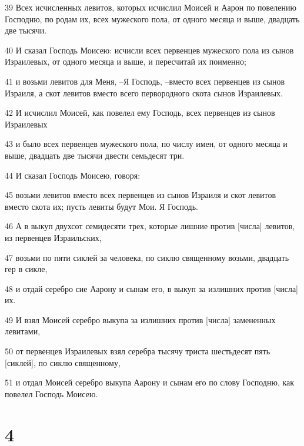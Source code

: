 \par 39 Всех исчисленных левитов, которых исчислил Моисей и Аарон по повелению Господню, по родам их, всех мужеского пола, от одного месяца и выше, двадцать две тысячи.
\par 40 И сказал Господь Моисею: исчисли всех первенцев мужеского пола из сынов Израилевых, от одного месяца и выше, и пересчитай их поименно;
\par 41 и возьми левитов для Меня, --Я Господь, --вместо всех первенцев из сынов Израиля, а скот левитов вместо всего первородного скота сынов Израилевых.
\par 42 И исчислил Моисей, как повелел ему Господь, всех первенцев из сынов Израилевых
\par 43 и было всех первенцев мужеского пола, по числу имен, от одного месяца и выше, двадцать две тысячи двести семьдесят три.
\par 44 И сказал Господь Моисею, говоря:
\par 45 возьми левитов вместо всех первенцев из сынов Израиля и скот левитов вместо скота их; пусть левиты будут Мои. Я Господь.
\par 46 А в выкуп двухсот семидесяти трех, которые лишние против [числа] левитов, из первенцев Израильских,
\par 47 возьми по пяти сиклей за человека, по сиклю священному возьми, двадцать гер в сикле,
\par 48 и отдай серебро сие Аарону и сынам его, в выкуп за излишних против [числа] их.
\par 49 И взял Моисей серебро выкупа за излишних против [числа] замененных левитами,
\par 50 от первенцев Израилевых взял серебра тысячу триста шестьдесят пять [сиклей], по сиклю священному,
\par 51 и отдал Моисей серебро выкупа Аарону и сынам его по слову Господню, как повелел Господь Моисею.

\chapter{4}

